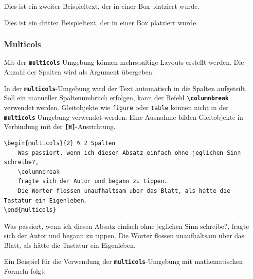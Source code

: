 \hfill
\parbox[t]{0.3\textwidth}{Dies ist ein zweiter Beispieltext, der in einer Box platziert wurde.}
\hfill
\colorbox{red!20}{\parbox[t]{0.3\textwidth}{Dies ist ein dritter Beispieltext, der in einer Box platziert wurde.}}

\subsubsection{Multicols}
Mit der \textbf{\texttt{multicols}}-Umgebung können mehrspaltige Layouts erstellt werden. Die Anzahl der Spalten wird als Argument übergeben.

In der \textbf{\texttt{multicols}}-Umgebung wird der Text automatisch in die Spalten aufgeteilt. Soll ein manueller Spaltenumbruch erfolgen, kann der Befehl \textbf{\texttt{\textbackslash columnbreak}} verwendet werden. Gleitobjekte wie \texttt{figure} oder \texttt{table} können nicht in der \textbf{\texttt{multicols}}-Umgebung verwendet werden. Eine Ausnahme bilden Gleitobjekte in Verbindung mit der \textbf{\texttt{[H]}}-Ausrichtung.

\begin{minipage}[c]{0.58\textwidth}
    \begin{lstlisting}[language={[LaTeX]TeX}, basicstyle=\small\ttfamily]
\begin{multicols}{2} % 2 Spalten
    Was passiert, wenn ich diesen Absatz einfach ohne jeglichen Sinn schreibe?,
    \columnbreak
    fragte sich der Autor und begann zu tippen. 
    Die Worter flossen unaufhaltsam uber das Blatt, als hatte die Tastatur ein Eigenleben.
\end{multicols}
    \end{lstlisting}
\end{minipage}
\hfill
\begin{minipage}[c]{0.38\textwidth}
    \begin{multicols}{2} %
        Was passiert, wenn ich diesen Absatz einfach ohne jeglichen Sinn schreibe?,
        \columnbreak
        fragte sich der Autor und begann zu tippen.
        Die Wörter flossen unaufhaltsam über das Blatt, als hätte die Tastatur ein Eigenleben.
    \end{multicols}
\end{minipage}

Ein Beispiel für die Verwendung der \textbf{\texttt{multicols}}-Umgebung mit mathematischen Formeln folgt:

